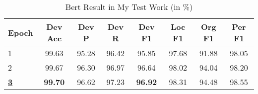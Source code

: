 \begin{table*}[htbp!]
    \centering
    \begin{tabular}{lccccccc}
    \midrule
    Epoch & Dev Acc & Dev P & Dev R & Dev F1    & Loc F1 & Org F1 & Per F1\\
    \midrule
    1     & 99.63   & 95.28 & 96.42 & 95.85     & 97.68  & 91.88  & 98.05  \\
    2     & 99.67   & 96.30 & 96.97 & 96.64     & 98.02  & 94.04  & 98.20  \\
    \underline{\bf3}& \bf99.70 & 96.62 & 97.23  & \bf96.92  & 98.31& 94.48  & 98.55  \\
    \bottomrule
    \end{tabular}
\caption{Bert Result in My Test Work (in \%)}
\label{tab:batchSize}
\end{table*}

